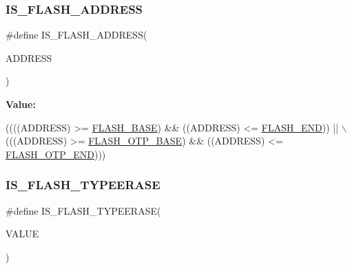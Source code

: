 \subsubsection{\texorpdfstring{I\+S\+\_\+\+F\+L\+A\+S\+H\+\_\+\+A\+D\+D\+R\+E\+SS}{IS\_FLASH\_ADDRESS}}
{\footnotesize\ttfamily \#define I\+S\+\_\+\+F\+L\+A\+S\+H\+\_\+\+A\+D\+D\+R\+E\+SS(\begin{DoxyParamCaption}\item[{}]{A\+D\+D\+R\+E\+SS }\end{DoxyParamCaption})}

{\bfseries Value\+:}
\begin{DoxyCode}
((((ADDRESS) >= \hyperlink{group___peripheral__memory__map_ga23a9099a5f8fc9c6e253c0eecb2be8db}{FLASH\_BASE}) && ((ADDRESS) <= \hyperlink{group___peripheral__memory__map_ga8be554f354e5aa65370f6db63d4f3ee4}{FLASH\_END})) || \(\backslash\)
                                   (((ADDRESS) >= \hyperlink{group___peripheral__memory__map_ga91d296a67aec0da8f31c368cbc0eea94}{FLASH\_OTP\_BASE}) && ((ADDRESS) <= 
      \hyperlink{group___peripheral__memory__map_ga5bec9c5a91e312fca36f256f508ceee1}{FLASH\_OTP\_END})))
\end{DoxyCode}
\mbox{\label{group___f_l_a_s_h_ex___i_s___f_l_a_s_h___definitions_gaf15a6822d2421a33b6857059348ab476}} 
\subsubsection{\texorpdfstring{I\+S\+\_\+\+F\+L\+A\+S\+H\+\_\+\+T\+Y\+P\+E\+E\+R\+A\+SE}{IS\_FLASH\_TYPEERASE}}
{\footnotesize\ttfamily \#define I\+S\+\_\+\+F\+L\+A\+S\+H\+\_\+\+T\+Y\+P\+E\+E\+R\+A\+SE(\begin{DoxyParamCaption}\item[{}]{V\+A\+L\+UE }\end{DoxyParamCaption})}

